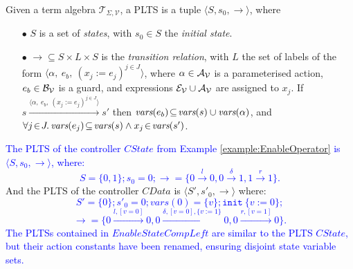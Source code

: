 \documentclass[smallcondensed]{svjour3}
\newcommand{\noteSB}[2][color=green!40, size=\tiny]{\todo[#1]{{\bf Simon: } {#2}}}
\newcommand{\ERIC}[1]{\textcolor{blue}{#1}}
\newcommand{\QIN}[1]{\textcolor{airforceblue}{#1}}
\newcommand{\cT}{\ensuremath{\mathcal{T}}}
\newcommand{\cV}{\ensuremath{\mathcal{V}}}
\newcommand{\signature}{\ensuremath{\Sigma}}
\newcommand{\variables}{\ensuremath{\cV}}
\newcommand{\Talg}{\ensuremath{\cT_{\signature,\variables}}}
\def\AlgE{\mathcal{E}}
\def\AlgA{\mathcal{A}}
\def\AlgB{\mathcal{B}}
\newcommand{\YX}[1]{{\color{red}#1}}
\begin{document}
\begin{definition}[PLTS]
	\label{PLTS}
	Given a term algebra $\Talg$, a PLTS is a tuple
	$\langle S,s_0, \to\rangle$, where
	\begin{itemize}
		\item[$\bullet$]
		$S$ is a set of \emph{states}, with $s_0 \in S$ the \emph{initial state}.
		\item[$\bullet$] $\to \subseteq S \times L \times S$ is the \emph{transition relation}, with
		$L$ the set of labels of the form
		$\langle \alpha,~e_b,~(x_j\!:= {e}_j)^{j\in J}\rangle$,
		where $\alpha \in\AlgA_{\P}$ is a parameterised action,
		$e_b \in \AlgB_{\P}$ is a guard, and
		expressions  $\AlgE_{\P}\cup\AlgA_{\P}$ are assigned to $x_j$.
		If 
		$s \xrightarrow{\langle \alpha,~e_b,~(x_j\!:= {e}_j)^{j\in
				J}\rangle} s'$ then 
		$\vars(e_b)\!\subseteq\! \vars(s)\cup\vars(\alpha)$, and
		$\forall j\!\in\! J .\,\vars(e_j)\!\subseteq\! \vars(s)\land 
		x_j\!\in\!\vars(s')$.
	\end{itemize}
\end{definition}


\begin{example}

  \ERIC{
The PLTS of the controller $CState$ from Example \ref{example:EnableOperator} is  $\langle S,s_0, \to\rangle$, where:
$$S=\{0, 1\}; s_0=0;
	 \to=\{0\xrightarrow{l}0, 0\xrightarrow{\delta}1, 1\xrightarrow{r}1\}.$$
}
  \QIN{
\YX{And the PLTS of the controller $CData$ is $\langle S',s'_0, \to\rangle$} where:
 \ERIC{$$S'=\{0\}; s'_0=0; vars(0)=\{v\}; \texttt{init}\ \{v:=0\};$$
	 $$\to=\{0\xrightarrow{l, [v=0]}0, 0\xrightarrow{\delta,  [v=0], \{v:=1\}}0, 0\xrightarrow{r, [v=1]}0\}.$$
  }}
\ERIC{The PLTSs contained in $EnableStateCompLeft$ are similar to the PLTS $CState$, but their action constants have been renamed, ensuring disjoint state variable sets.}
\end{example}
\end{document}
